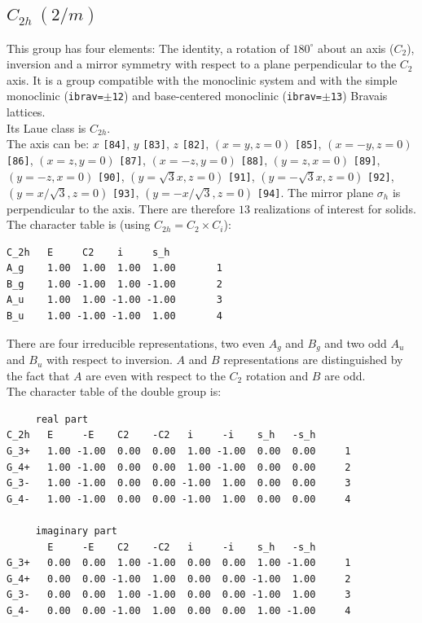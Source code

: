 \documentclass[12pt,a4paper]{article}
\begin{document}
\subsection{\color{web-blue}$C_{2h}\ (2/m)$} 
This group has four elements: The identity, a rotation of $180^\circ$ 
about an axis ($C_2$), inversion and a mirror symmetry with respect to 
a plane perpendicular to the $C_2$ axis.
It is a group compatible with the monoclinic system and with the  
simple monoclinic (\texttt{ibrav=$\pm$12}) and base-centered monoclinic
(\texttt{ibrav=$\pm$13}) Bravais lattices. \\ 
Its Laue class is $C_{2h}$. \\
The axis can be:
$x$ \texttt{[84]}, $y$ \texttt{[83]}, $z$ \texttt{[82]}, 
$(x=y, z=0)$ \texttt{[85]}, $(x=-y, z=0)$ \texttt{[86]}, 
$(x=z, y=0)$ \texttt{[87]}, $(x=-z, y=0)$ \texttt{[88]},
$(y=z, x=0)$ \texttt{[89]}, 
$(y=-z, x=0)$ \texttt{[90]}, $(y=\sqrt{3}x, z=0)$ \texttt{[91]}, 
$(y=-\sqrt{3}x, z=0)$ \texttt{[92]},
$(y=x/\sqrt{3}, z=0)$ \texttt{[93]}, 
$(y=-x/\sqrt{3}, z=0)$ \texttt{[94]}. The mirror plane $\sigma_h$ 
is perpendicular to the axis. There are therefore $13$ realizations 
of interest for solids. \\
The character table is (using $C_{2h}=C_2 \times C_i$):
\begin{verbatim}
C_2h   E     C2    i     s_h
A_g    1.00  1.00  1.00  1.00       1
B_g    1.00 -1.00  1.00 -1.00       2
A_u    1.00  1.00 -1.00 -1.00       3
B_u    1.00 -1.00 -1.00  1.00       4
\end{verbatim}
There are four irreducible representations, two even $A_g$ and $B_g$ and
two odd $A_u$ and $B_u$ with respect to inversion. $A$ and $B$ representations
are distinguished by the fact that $A$ are even with respect
to the $C_2$ rotation and $B$ are odd. \\
The character table of the double group is:
\begin{verbatim}
     real part
C_2h   E     -E    C2    -C2   i     -i    s_h   -s_h 
G_3+   1.00 -1.00  0.00  0.00  1.00 -1.00  0.00  0.00     1
G_4+   1.00 -1.00  0.00  0.00  1.00 -1.00  0.00  0.00     2
G_3-   1.00 -1.00  0.00  0.00 -1.00  1.00  0.00  0.00     3
G_4-   1.00 -1.00  0.00  0.00 -1.00  1.00  0.00  0.00     4

     imaginary part
       E     -E    C2    -C2   i     -i    s_h   -s_h 
G_3+   0.00  0.00  1.00 -1.00  0.00  0.00  1.00 -1.00     1
G_4+   0.00  0.00 -1.00  1.00  0.00  0.00 -1.00  1.00     2
G_3-   0.00  0.00  1.00 -1.00  0.00  0.00 -1.00  1.00     3
G_4-   0.00  0.00 -1.00  1.00  0.00  0.00  1.00 -1.00     4
\end{verbatim}
\end{document}

